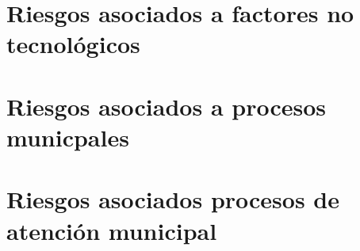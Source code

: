 


\section{Riesgos asociados a factores no tecnológicos}

\section{Riesgos asociados a procesos municpales}



\section{Riesgos asociados procesos de atención municipal}



